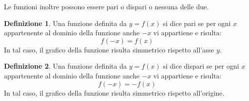 \documentclass[a4paper]{article}
\theoremstyle{plain}
\theoremstyle{definition}
\newtheorem{definizione}{Definizione}
\theoremstyle{remark}
\begin{document}
Le funzioni inoltre possono essere pari o dispari o nessuna delle due.
\begin{definizione}
    Una funzione definita da $y=f(x)$ si dice pari se per ogni $x$ appartenente al dominio della funzione anche $-x$ vi appartiene e risulta:
    \begin{equation}
        f(-x)=f(x)
    \end{equation}
    In tal caso, il grafico della funzione risulta simmetrico rispetto all'asse $y$.
\end{definizione}
\begin{definizione}
    Una funzione definita da $y=f(x)$ si dice dispari se per ogni $x$ appartenente al dominio della funzione anche $-x$ vi appartiene e risulta:
    \begin{equation}
        f(-x)=-f(x)
    \end{equation}
    In tal caso, il grafico della funzione risulta simmetrico rispetto all'origine.
\end{definizione}
\end{document}
